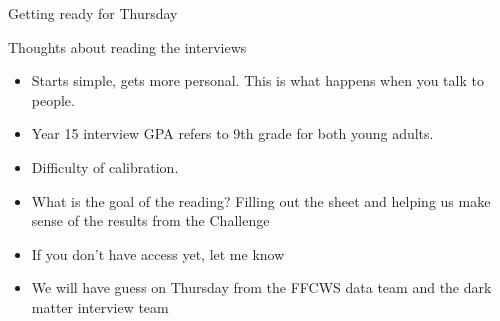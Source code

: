 \documentclass[aspectratio=169]{beamer}
\begin{document}
\begin{frame}

Getting ready for Thursday

\end{frame}
\begin{frame}

Thoughts about reading the interviews
\begin{itemize}
\item Starts simple, gets more personal.  This is what happens when you talk to people. \pause
\item Year 15 interview GPA refers to 9th grade for both young adults.\pause
\item Difficulty of calibration. \pause
\item What is the goal of the reading? Filling out the sheet and helping us make sense of the results from the Challenge \pause
\item If you don't have access yet, let me know \pause
\item We will have guess on Thursday from the FFCWS data team and the dark matter interview team \pause
\end{itemize}

\end{frame}




\frame{\titlepage}
\end{document}
